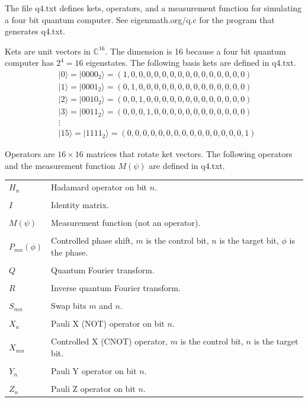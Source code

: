 \documentclass[12pt]{article}
\begin{document}
\noindent
The file q4.txt defines kets, operators, and a measurement function
for simulating a four bit quantum computer.
See eigenmath.org/q.c for the program that generates q4.txt.

\bigskip
\noindent
Kets are unit vectors in $\mathbb{C}^{16}$.
The dimension is 16 because a four bit quantum computer has $2^4=16$ eigenstates.
The following basis kets are defined in q4.txt.
\begin{align*}
&|0\rangle=|0000_2\rangle=(1,0,0,0,0,0,0,0,0,0,0,0,0,0,0,0)
\\
&|1\rangle=|0001_2\rangle=(0,1,0,0,0,0,0,0,0,0,0,0,0,0,0,0)
\\
&|2\rangle=|0010_2\rangle=(0,0,1,0,0,0,0,0,0,0,0,0,0,0,0,0)
\\
&|3\rangle=|0011_2\rangle=(0,0,0,1,0,0,0,0,0,0,0,0,0,0,0,0)
\\
&\vdots
\\
&|15\rangle=|1111_2\rangle=(0,0,0,0,0,0,0,0,0,0,0,0,0,0,0,1)
\end{align*}

\noindent
Operators are $16\times16$ matrices that rotate ket vectors.
The following operators and the measurement function $M(\psi)$ are defined in q4.txt.

\bigskip
\begin{tabular}{l l}
$H_n$ & Hadamard operator on bit $n$.
\\
\\
$I$ & Identity matrix.
\\
\\
$M(\psi)$ & Measurement function (not an operator).
\\
\\
$P_{mn}(\phi)$ & Controlled phase shift, $m$ is the control bit, $n$ is the target bit, $\phi$ is the phase.
\\
\\
$Q$ & Quantum Fourier transform.
\\
\\
$R$ & Inverse quantum Fourier transform.
\\
\\
$S_{mn}$ & Swap bits $m$ and $n$.
\\
\\
$X_n$ & Pauli X (NOT) operator on bit $n$.
\\
\\
$X_{mn}$ & Controlled X (CNOT) operator, $m$ is the control bit, $n$ is the target bit.
\\
\\
$Y_n$ & Pauli Y operator on bit $n$.
\\
\\
$Z_n$ & Pauli Z operator on bit $n$.
\end{tabular}
\end{document}

